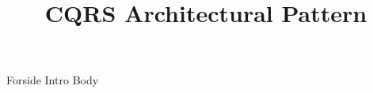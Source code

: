 \documentclass[a4paper,openany]{memoir}
\title{CQRS Architectural Pattern}
\begin{document}
	{Forside}  \newpage
	\tableofcontents\thispagestyle{fancy}  \newpage
	{Intro}  \newpage
	{Body}  \newpage
\end{document}

